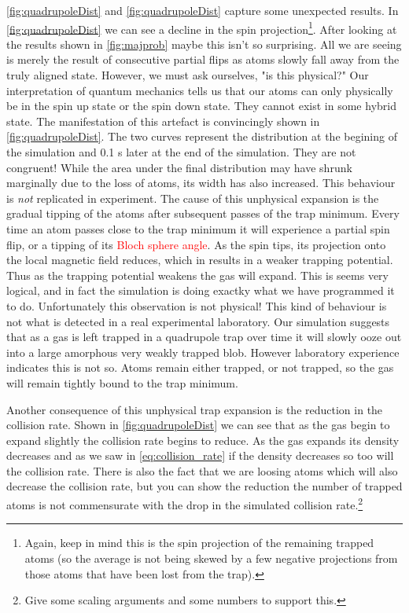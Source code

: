 \autoref{fig:quadrupoleDist} and \autoref{fig:quadrupoleDist} capture some unexpected results.
In \autoref{fig:quadrupoleDist} we can see a decline in the spin projection\footnote{Again, keep in mind this is the spin projection of the remaining trapped atoms (so the average is not being skewed by a few negative projections from those atoms that have been lost from the trap).}.
After looking at the results shown in \autoref{fig:majprob} maybe this isn't so surprising.
All we are seeing is merely the result of consecutive partial flips as atoms slowly fall away from the truly aligned state.
However, we must ask ourselves, "is this physical?"
Our interpretation of quantum mechanics tells us that our atoms can only physically be in the spin up state or the spin down state.
They cannot exist in some hybrid state.
The manifestation of this artefact is convincingly shown in \autoref{fig:quadrupoleDist}.
The two curves represent the distribution at the begining of the simulation and 0.1 s later at the end of the simulation.
They are not congruent!
While the area under the final distribution may have shrunk marginally due to the loss of atoms, its width has also increased.
This behaviour is \emph{not} replicated in experiment.
The cause of this unphysical expansion is the gradual tipping of the atoms after subsequent passes of the trap minimum.
Every time an atom passes close to the trap minimum it will experience a partial spin flip, or a tipping of its \textcolor{red}{Bloch sphere angle}.
As the spin tips, its projection onto the local magnetic field reduces, which in results in a weaker trapping potential.
Thus as the trapping potential weakens the gas will expand.
This is seems very logical, and in fact the simulation is doing exactky what we have programmed it to do.
Unfortunately this observation is not physical!
This kind of behaviour is not what is detected in a real experimental laboratory.
Our simulation suggests that as a gas is left trapped in a quadrupole trap over time it will slowly ooze out into a large amorphous very weakly trapped blob.
However laboratory experience indicates this is not so.
Atoms remain either trapped, or not trapped, so the gas will remain tightly bound to the trap minimum.

Another consequence of this unphysical trap expansion is the reduction in the collision rate. 
Shown in \autoref{fig:quadrupoleDist} we can see that as the gas begin to expand slightly the collision rate begins to reduce.
As the gas expands its density decreases and as we saw in \autoref{eq:collision_rate} if the density decreases so too will the collision rate.
There is also the fact that we are loosing atoms which will also decrease the collision rate, but you can show the reduction the number of trapped atoms is not commensurate with the drop in the simulated collision rate.\footnote{Give some scaling arguments and some numbers to support this.}
